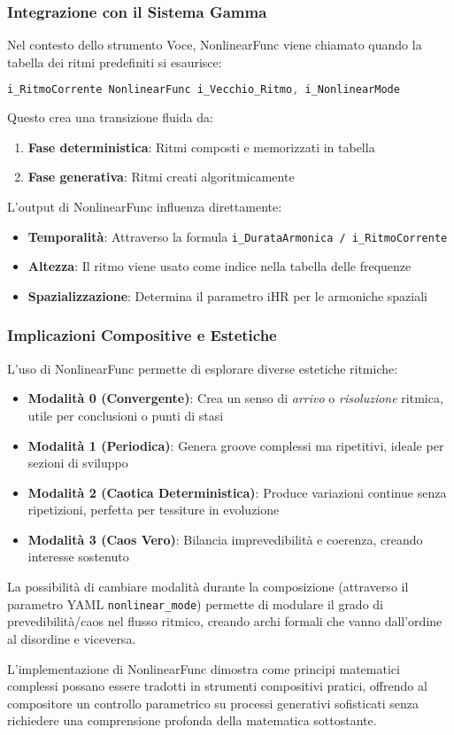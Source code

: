 \subsubsection{Integrazione con il Sistema Gamma}
Nel contesto dello strumento Voce, NonlinearFunc viene chiamato quando la tabella dei ritmi predefiniti si esaurisce:

\begin{lstlisting}[language=C]
i_RitmoCorrente NonlinearFunc i_Vecchio_Ritmo, i_NonlinearMode
\end{lstlisting}

Questo crea una transizione fluida da:
\begin{enumerate}
    \item \textbf{Fase deterministica}: Ritmi composti e memorizzati in tabella
    \item \textbf{Fase generativa}: Ritmi creati algoritmicamente
\end{enumerate}
L'output di NonlinearFunc influenza direttamente:
\begin{itemize}
    \item \textbf{Temporalità}: Attraverso la formula \texttt{i\_DurataArmonica / i\_RitmoCorrente}
    \item \textbf{Altezza}: Il ritmo viene usato come indice nella tabella delle frequenze
    \item \textbf{Spazializzazione}: Determina il parametro iHR per le armoniche spaziali
\end{itemize}
\subsubsection{Implicazioni Compositive e Estetiche}
L'uso di NonlinearFunc permette di esplorare diverse estetiche ritmiche:

\begin{itemize}
    \item \textbf{Modalità 0 (Convergente)}: Crea un senso di \textit{arrivo} o \textit{risoluzione} ritmica, utile per conclusioni o punti di stasi
    \item \textbf{Modalità 1 (Periodica)}: Genera groove complessi ma ripetitivi, ideale per sezioni di sviluppo
    \item \textbf{Modalità 2 (Caotica Deterministica)}: Produce variazioni continue senza ripetizioni, perfetta per tessiture in evoluzione
    \item \textbf{Modalità 3 (Caos Vero)}: Bilancia imprevedibilità e coerenza, creando interesse sostenuto
\end{itemize}

La possibilità di cambiare modalità durante la composizione (attraverso il parametro YAML \texttt{nonlinear\_mode}) permette di modulare il grado di prevedibilità/caos nel flusso ritmico, creando archi formali che vanno dall'ordine al disordine e viceversa.

L'implementazione di NonlinearFunc dimostra come principi matematici complessi possano essere tradotti in strumenti compositivi pratici, offrendo al compositore un controllo parametrico su processi generativi sofisticati senza richiedere una comprensione profonda della matematica sottostante.